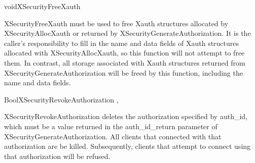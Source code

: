 \begin{keeptogether}
\begin{cfunction}{void}{XSecurityFreeXauth}
\end{cfunction}

XSecurityFreeXauth must be used to free Xauth structures
allocated by XSecurityAllocXauth or returned by
XSecurityGenerateAuthorization.  It is the caller's responsibility to
fill in the name and data fields of Xauth structures allocated with
XSecurityAllocXauth, so this function will not attempt to free
them.  In contrast, all storage associated with Xauth structures
returned from XSecurityGenerateAuthorization will be freed by this
function, including the name and data fields.

\end{keeptogether}

\begin{keeptogether}
\begin{cfunction}{Bool}{XSecurityRevokeAuthorization}
,
\end{cfunction}

XSecurityRevokeAuthorization deletes the authorization specified by
auth\_id, which must be a value returned in the auth\_id\_return
parameter of XSecurityGenerateAuthorization.  All clients that
connected with that authorization are be killed.  Subsequently,
clients that attempt to connect using that authorization will be
refused.

\end{keeptogether}

